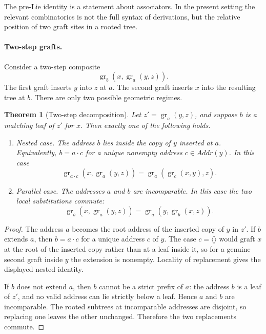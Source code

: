 \documentclass[11pt]{article}
\newtheorem{theorem}{Theorem}
\newcommand{\Addr}{\mathit{Addr}}
\begin{document}
The pre-Lie identity is a statement about associators.  In the present setting
the relevant combinatorics is not the full syntax of derivations, but the
relative position of two graft sites in a rooted tree.

\paragraph{Two-step grafts.}
Consider a two-step composite
\[
\operatorname{gr}_b(x,\operatorname{gr}_a(y,z)).
\]
The first graft inserts \(y\) into \(z\) at \(a\).  The second graft inserts
\(x\) into the resulting tree at \(b\).  There are only two possible geometric
regimes.

\begin{theorem}[Two-step decomposition]
Let \(z'=\operatorname{gr}_a(y,z)\), and suppose \(b\) is a matching leaf of
\(z'\) for \(x\).  Then exactly one of the following holds.
\begin{enumerate}[label=\textup{(\roman*)}]
\item \emph{Nested case.}  The address \(b\) lies inside the copy of \(y\)
inserted at \(a\).  Equivalently, \(b=a\cdot c\) for a unique nonempty address
\(c\in\Addr(y)\).  In this case
\[
\operatorname{gr}_{a\cdot c}(x,\operatorname{gr}_a(y,z))
=
\operatorname{gr}_a(\operatorname{gr}_c(x,y),z).
\]
\item \emph{Parallel case.}  The addresses \(a\) and \(b\) are incomparable.
In this case the two local substitutions commute:
\[
\operatorname{gr}_b(x,\operatorname{gr}_a(y,z))
=
\operatorname{gr}_a(y,\operatorname{gr}_b(x,z)).
\]
\end{enumerate}
\end{theorem}

\begin{proof}
The address \(a\) becomes the root address of the inserted copy of \(y\) in
\(z'\).  If \(b\) extends \(a\), then \(b=a\cdot c\) for a unique address
\(c\) of \(y\).  The case \(c=\langle\rangle\) would graft \(x\) at the root of
the inserted copy rather than at a leaf inside it, so for a genuine second
graft inside \(y\) the extension is nonempty.  Locality of replacement gives
the displayed nested identity.

If \(b\) does not extend \(a\), then \(b\) cannot be a strict prefix of \(a\):
the address \(b\) is a leaf of \(z'\), and no valid address can lie strictly
below a leaf.  Hence \(a\) and \(b\) are incomparable.  The rooted subtrees at
incomparable addresses are disjoint, so replacing one leaves the other
unchanged.  Therefore the two replacements commute.
\end{proof}
\end{document}
